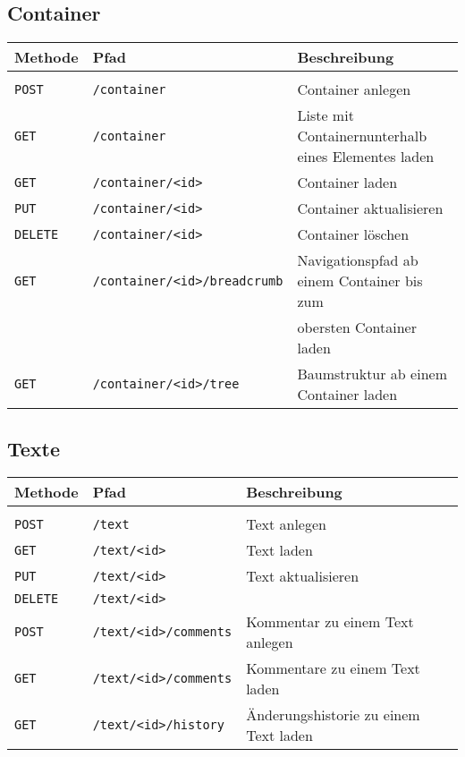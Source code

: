 \subsection{Container}

\begin{tabular}{@{}l l l}
\textbf{Methode} & \textbf{Pfad} & \textbf{Beschreibung}\\
\hline\\[-1.5ex]
\texttt{POST} & \texttt{/container}& Container anlegen\\
\texttt{GET} & \texttt{/container} & Liste mit Containernunterhalb eines Elementes laden\\
\texttt{GET} & \texttt{/container/<id>} & Container laden\\
\texttt{PUT} & \texttt{/container/<id>} & Container aktualisieren\\
\texttt{DELETE} & \texttt{/container/<id>} & Container löschen\\
\texttt{GET} & \texttt{/container/<id>/breadcrumb} & Navigationspfad ab einem Container bis zum\\
&&obersten Container laden\\
\texttt{GET} & \texttt{/container/<id>/tree} & Baumstruktur ab einem Container laden\\
\end{tabular}

\subsection{Texte}

\begin{tabular}{@{}l l l}
\textbf{Methode} & \textbf{Pfad} & \textbf{Beschreibung}\\
\hline\\[-1.5ex]
\texttt{POST} & \texttt{/text} & Text anlegen\\
\texttt{GET} & \texttt{/text/<id>} & Text laden\\
\texttt{PUT} & \texttt{/text/<id>} & Text aktualisieren\\
\texttt{DELETE} & \texttt{/text/<id>}\\
\texttt{POST} & \texttt{/text/<id>/comments} & Kommentar zu einem Text anlegen\\
\texttt{GET} & \texttt{/text/<id>/comments} & Kommentare zu einem Text laden\\
\texttt{GET} & \texttt{/text/<id>/history} & Änderungshistorie zu einem Text laden\\
\end{tabular}

